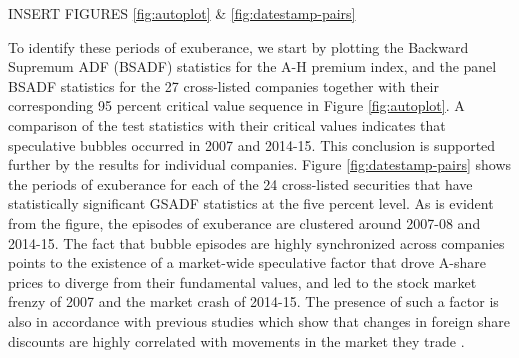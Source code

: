 \documentclass[11pt]{article}
\begin{document}
\bigskip
\begin{center}
INSERT FIGURES \ref{fig:autoplot} \& \ref{fig:datestamp-pairs}
\end{center}
\bigskip




To identify these periods of exuberance, we start by plotting the Backward Supremum ADF (BSADF) statistics for the A-H premium index, and the panel BSADF statistics for the 27 cross-listed companies together with their corresponding 95 percent critical value sequence in Figure \ref{fig:autoplot}. A comparison of the test statistics with their critical values indicates that speculative bubbles occurred in 2007 and 2014-15. This conclusion  is supported further by the results for individual companies. Figure \ref{fig:datestamp-pairs} shows the periods of exuberance for each of the 24 cross-listed securities that have statistically significant GSADF statistics at the five percent level. As is evident from the figure, the episodes of exuberance are clustered around 2007-08 and 2014-15. The fact that bubble episodes are highly synchronized across companies points to the existence of a market-wide speculative factor that drove A-share prices to diverge from their fundamental values, and led to the stock market frenzy of 2007 and the market crash of 2014-15. The presence of such a factor is also in accordance with previous studies which show that changes in foreign share discounts are highly correlated with movements in the market they trade \citep{frootD1999}.




\end{document}

